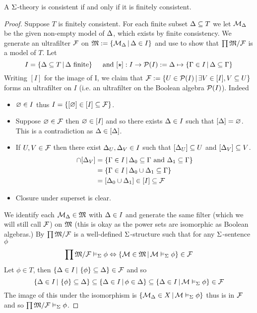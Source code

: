 \begin{cor}
    A $\Sigma$-theory is consistent if and only if it is finitely consistent.
\end{cor}
\begin{proof}
    Suppose $T$ is finitely consistent.
    For each finite subset $\Delta \subseteq T$ we let $\mathcal{M}_\Delta$ be the given 
    non-empty model of $\Delta$,
    which exists by finite consistency.
    We generate an ultrafilter $\mathcal{F}$ on 
    $\mathfrak{M} := \left\{\mathcal{M}_\Delta \,|\, \Delta \in I\right\}$ and use 
     to show that
    $\prod \mathfrak{M} / \mathcal{F}$ is a model of $T$.
    Let
    \[I = \left\{\Delta \subseteq T \,|\, \Delta \text{ finite}\right\}
    \quad \text{ and } [\star] : I \to \mathcal{P}(I) := 
    \Delta \mapsto \left\{\Gamma \in I \,|\, \Delta \subseteq \Gamma\right\}\]
    Writing $[I]$ for the image of I,
    we claim that $\mathcal{F} := \left\{U \in \mathcal{P}(I) \,|\, \exists V \in [I], V \subseteq U\right\}$
    forms an ultrafilter on $I$ 
    (i.e. an ultrafilter on the Boolean algebra $\mathcal{P}(I)$).
    Indeed 
    \begin{itemize}
        \item $\varnothing \in I$ thus $I = \left\{[\varnothing]  \in [I] \subseteq \mathcal{F}\right\}$.
        \item Suppose $\varnothing \in \mathcal{F}$ then $\varnothing \in [I]$ and so there 
            exists $\Delta \in I$ such that $[\Delta] = \varnothing$.
            This is a contradiction as $\Delta \in [\Delta]$.
        \item If $U, V \in \mathcal{F}$ then there exist $\Delta_U, \Delta_V \in I$ 
            such that $[\Delta_U] \subseteq U$ and $[\Delta_V] \subseteq V$. 
            \begin{align*}
                [\De_U] \cap [\De_V] &
                = \set{\Ga \in I \st \De_0 \subs \Ga 
                \text{ and } \De_1 \subs \Ga}\\
                &= \set{\Ga \in I \st \De_0 \cup \De_1 \subs \Ga}\\
                &= [\De_0 \cup \De_1] \in [I] \subs \FF
            \end{align*}
        \item Closure under superset is clear.
    \end{itemize}
    We identify each $\mathcal{M}_\Delta \in \mathfrak{M}$ with $\Delta \in I$ and generate
    the same filter (which we will still call $\mathcal{F}$) on $\mathfrak{M}$ 
    (this is okay as the power sets are isomorphic as Boolean algebras.)
    By  $\prod \mathfrak{M} / \mathcal{F}$ is 
    a well-defined $\Sigma$-structure such that for any $\Sigma$-sentence $\phi$
    \[\prod \mathfrak{M} / \mathcal{F} \vDash_{\Sigma} \phi \Leftrightarrow 
    \left\{\mathcal{M} \in \mathfrak{M} \,|\, \mathcal{M} \vDash_{\Sigma} \phi\right\} \in \mathcal{F}\]
    Let $\phi \in T$, 
    then $\left\{\Delta \in I \,|\, \left\{\phi\right\} \subseteq \Delta\right\} \in \mathcal{F}$ and so
    \[
        \left\{\Delta \in I \,|\, \left\{\phi\right\} \subseteq \Delta\right\} \subseteq 
        \left\{\Delta \in I \,|\, \phi \in \Delta\right\} \subseteq
        \left\{\Delta \in I \,|\, \mathcal{M} \vDash_{\Sigma} \phi\right\} \in \mathcal{F}
    \]
    The image of this under the isomorphism is 
    $\left\{\mathcal{M}_\Delta \in X \,|\, \mathcal{M} \vDash_{\Sigma} \phi\right\}$ thus is in $\mathcal{F}$ and so 
    $\prod \mathfrak{M} / \mathcal{F} \vDash_{\Sigma} \phi$.
\end{proof}